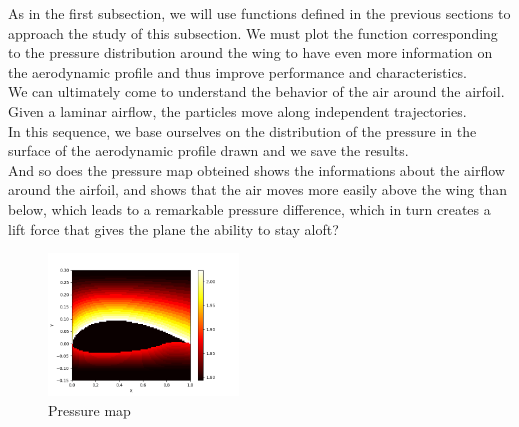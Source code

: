 As in the first subsection, we will use functions defined in the previous sections to approach the study of this subsection.
We must plot the function corresponding to the pressure distribution around the wing to have even more information on the aerodynamic profile and thus improve performance and characteristics.\\
We can ultimately come to understand the behavior of the air around the airfoil.\\
Given a laminar airflow, the particles move along independent trajectories.\\
In this sequence, we base ourselves on the distribution of the pressure in the surface of the aerodynamic profile drawn and we save the results.\\
And so does the pressure map obteined shows the informations about the airflow around the airfoil, and shows that the air moves more easily above the wing than below, which leads to a remarkable pressure difference, which in turn creates a lift force that gives the plane the ability to stay aloft?\\
\begin{figure}[h]
  \centering
  \includegraphics[width=0.45\textwidth]{img/pressure_map.png}
  \caption{Pressure map}
  \label{fig:pressure}
\end{figure}